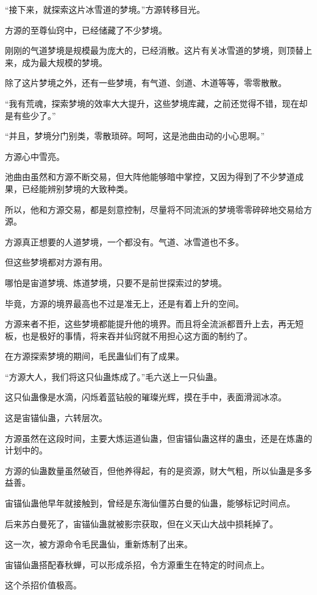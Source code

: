 \begin{this_body}
“接下来，就探索这片冰雪道的梦境。”方源转移目光。

方源的至尊仙窍中，已经储藏了不少梦境。

刚刚的气道梦境是规模最为庞大的，已经消散。这片有关冰雪道的梦境，则顶替上来，成为最大规模的梦境。

除了这片梦境之外，还有一些梦境，有气道、剑道、木道等等，零零散散。

“我有荒魂，探索梦境的效率大大提升，这些梦境库藏，之前还觉得不错，现在却是有些少了。”

“并且，梦境分门别类，零散琐碎。呵呵，这是池曲由动的小心思啊。”

方源心中雪亮。

池曲由虽然和方源不断交易，但大阵他能够暗中掌控，又因为得到了不少梦道成果，已经能辨别梦境的大致种类。

所以，他和方源交易，都是刻意控制，尽量将不同流派的梦境零零碎碎地交易给方源。

方源真正想要的人道梦境，一个都没有。气道、冰雪道也不多。

但这些梦境都对方源有用。

哪怕是宙道梦境、炼道梦境，只要不是前世探索过的梦境。

毕竟，方源的境界最高也不过是准无上，还是有着上升的空间。

方源来者不拒，这些梦境都能提升他的境界。而且将全流派都晋升上去，再无短板，也是极好的事情，将来吞并仙窍就不用担心这方面的制约了。

在方源探索梦境的期间，毛民蛊仙们有了成果。

“方源大人，我们将这只仙蛊炼成了。”毛六送上一只仙蛊。

这只仙蛊像是水滴，闪烁着蓝钻般的璀璨光辉，摸在手中，表面滑润冰凉。

这是宙锚仙蛊，六转层次。

方源虽然在这段时间，主要大炼运道仙蛊，但宙锚仙蛊这样的蛊虫，还是在炼蛊的计划中的。

方源的仙蛊数量虽然破百，但他养得起，有的是资源，财大气粗，所以仙蛊是多多益善。

宙锚仙蛊他早年就接触到，曾经是东海仙僵苏白曼的仙蛊，能够标记时间点。

后来苏白曼死了，宙锚仙蛊就被影宗获取，但在义天山大战中损耗掉了。

这一次，被方源命令毛民蛊仙，重新炼制了出来。

宙锚仙蛊搭配春秋蝉，可以形成杀招，令方源重生在特定的时间点上。

这个杀招价值极高。


\end{this_body}
